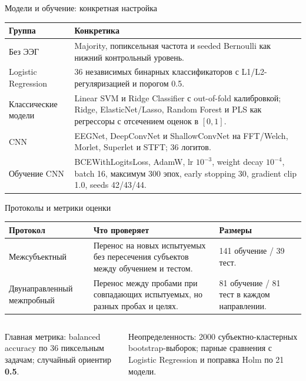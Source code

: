 \documentclass[aspectratio=169,10pt]{beamer}
\newcommand{\metric}[1]{\textcolor{ThesisBlue}{\textbf{#1}}}
\begin{document}
\begin{frame}{Модели и обучение: конкретная настройка}
  \small
  \begin{tabularx}{\textwidth}{@{}lY@{}}
    \toprule
    Группа & Конкретика \\
    \midrule
    Без ЭЭГ & Majority, попиксельная частота и seeded Bernoulli как нижний контрольный уровень. \\
    Logistic Regression & 36 независимых бинарных классификаторов с L1/L2-регуляризацией и порогом 0.5. \\
    Классические модели & Linear SVM и Ridge Classifier с out-of-fold калибровкой; Ridge, ElasticNet/Lasso, Random Forest и PLS как регрессоры с отсечением оценок в $[0,1]$. \\
    CNN & EEGNet, DeepConvNet и ShallowConvNet на FFT/Welch, Morlet, Superlet и STFT; 36 логитов. \\
    Обучение CNN & BCEWithLogitsLoss, AdamW, lr $10^{-3}$, weight decay $10^{-4}$, batch 16, максимум 300 эпох, early stopping 30, gradient clip 1.0, seeds 42/43/44. \\
    \bottomrule
  \end{tabularx}
\end{frame}

\begin{frame}{Протоколы и метрики оценки}
  \begin{tabularx}{\textwidth}{@{}lYY@{}}
    \toprule
    Протокол & Что проверяет & Размеры \\
    \midrule
    Межсубъектный & Перенос на новых испытуемых без пересечения субъектов между обучением и тестом. & 141 обучение / 39 тест. \\
    Двунаправленный межпробный & Перенос между пробами при совпадающих испытуемых, но разных пробах и целях. & 81 обучение / 81 тест в каждом направлении. \\
    \bottomrule
  \end{tabularx}
  \vspace{0.7em}
  \begin{columns}[T,totalwidth=\textwidth]
    \begin{column}{0.48\textwidth}
      \small Главная метрика: balanced accuracy по 36 пиксельным задачам; случайный ориентир \metric{0.5}.
    \end{column}
    \begin{column}{0.48\textwidth}
      \small Неопределенность: 2000 субъектно-кластерных bootstrap-выборок; парные сравнения с Logistic Regression и поправка Holm по 21 модели.
    \end{column}
  \end{columns}
\end{frame}
\end{document}
